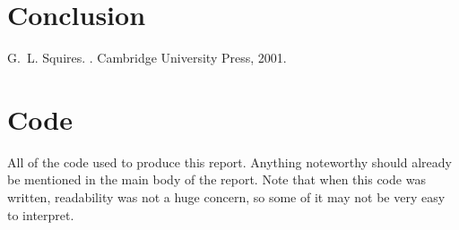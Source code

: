 \documentclass[11pt,a4paper]{article}
\begin{document}
\section{\label{sect:conclusion}Conclusion}




\begin{thebibliography}{1}

G.~L. Squires.
.
\newblock Cambridge University Press, 2001.

\end{thebibliography}

\appendix*
\section{Code}
All of the code used to produce this report. Anything noteworthy should already be mentioned in the main body of the report. Note that when this code was written, readability was not a huge concern, so some of it may not be very easy to interpret. 



\end{document}
